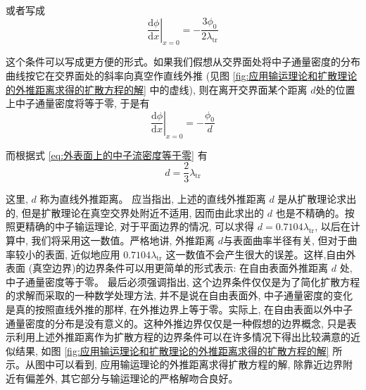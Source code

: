 \documentclass{Sichuan Normal University}
\begin{document}
\begin{itemize}
或者写成
\begin{equation}
\left.\frac{\mathrm{d} \phi}{\mathrm{d} x}\right|_{x=0}=-\frac{3 \phi_0}{2 \lambda_{\mathrm{tr}}}
\label{eq:外表面上的中子流密度等于零}
\end{equation}

这个条件可以写成更方便的形式。如果我们假想从交界面处将中子通量密度的分布曲线按它在交界面处的斜率向真空作直线外推 (见图 \ref{fig:应用输运理论和扩散理论的外推距离求得的扩散方程的解} 中的虚线), 则在离开交界面某个距离 $d$处的位置上中子通量密度将等于零, 于是有
\begin{equation}
\left.\frac{\mathrm{d} \phi}{\mathrm{d} x}\right|_{x=0}=-\frac{\phi_0}{d}
\end{equation}

而根据式 \eqref{eq:外表面上的中子流密度等于零} 有
\begin{equation}
d=\frac{2}{3} \lambda_{\mathrm{tr}}
\end{equation}

这里, $d$ 称为直线外推距离。
应当指出, 上述的直线外推距离 $d$ 是从扩散理论求出的, 但是扩散理论在真空交界处附近不适用, 因而由此求出的 $d$ 也是不精确的。按照更精确的中子输运理论, 对于平面边界的情况, 可以求得 $d=0.7104 \lambda_{\mathrm{tr}}$, 以后在计算中, 我们将采用这一数值。严格地讲, 外推距离 $d$与表面曲率半径有关, 但对于曲率较小的表面, 近似地应用 $0.7104 \lambda_{\mathrm{tr}}$ 这一数值不会产生很大的误差。这样,自由外表面 (真空边界)的边界条件可以用更简单的形式表示:
在自由表面外推距离 $d$ 处, 中子通量密度等于零。
最后必须强调指出, 这个边界条件仅仅是为了简化扩散方程的求解而采取的一种数学处理方法, 并不是说在自由表面外, 中子通量密度的变化是真的按照直线外推的那样, 在外推边界上等于零。实际上, 在自由表面以外中子通量密度的分布是没有意义的。这种外推边界仅仅是一种假想的边界概念, 只是表示利用上述外推距离作为扩散方程的边界条件可以在许多情况下得出比较满意的近似结果, 如图 \ref{fig:应用输运理论和扩散理论的外推距离求得的扩散方程的解} 所示。从图中可以看到, 应用输运理论的外推距离求得扩散方程的解, 除靠近边界附近有偏差外, 其它部分与输运理论的严格解吻合良好。



\end{itemize}
\end{document}
